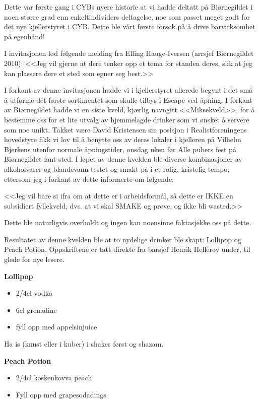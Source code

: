 Dette var første gang i CYBs nyere historie at vi hadde deltatt på Biørnegildet i noen større grad enn enkeltindividers deltagelse, noe som passet meget godt for det nye kjellerstyret i CYB. Dette ble vårt første forsøk på å drive barvirksomhet på egenhånd!

I invitasjonen lød følgende melding fra Elling Hauge-Iversen (arrsjef Biørnegildet 2010): <<Jeg vil gjerne at dere tenker opp et tema for standen deres, slik at jeg kan plassere dere et sted som egner seg best.>>

I forkant av denne invitasjonen hadde vi i kjellerstyret allerede begynt i det små å utforme det første sortimentet som skulle tilbys i Escape ved åpning. I forkant av Biørnegildet hadde vi en siste kveld, kjærlig navngitt <<Miksekveld>>, for å bestemme oss for et lite utvalg av hjemmelagde drinker som vi ønsket å servere som noe unikt. Takket være David Kristensen sin posisjon i Realistforeningens hovedstyre fikk vi lov til å benytte oss av deres lokaler i kjelleren på Vilhelm Bjerkens utenfor normale åpningstider, onsdag uken før Alle pubers fest på Biørnegildet fant sted. I løpet av denne kvelden ble diverse kombinasjoner av alkoholvarer og blandevann testet og smakt på i et rolig, kristelig tempo, ettersom jeg i forkant av dette informerte om følgende:

<<Jeg vil bare si ifra om at dette er i arbeidsformål, så dette er IKKE en subsidiert fyllekveld, dvs. at vi skal SMAKE og prøve, og ikke bli wasted.>>

Dette ble naturligvis overholdt og ingen kan noensinne faktasjekke oss på dette.

Resultatet av denne kvelden ble at to nydelige drinker ble skapt: Lollipop og Peach Potion. Oppskriftene er tatt direkte fra barsjef Henrik Hellerøy under, til glede for nye lesere.

\textbf{Lollipop}

\begin{itemize}
	\item 2/4cl vodka
	\item 6cl grenadine
	\item fyll opp med appelsinjuice
\end{itemize}

Ha is (knust eller i kuber) i shaker først og shazam.

\textbf{Peach Potion}

\begin{itemize}
	\item 2/4cl koskenkovva peach
	\item Fyll opp med grapesodadings
\end{itemize}

